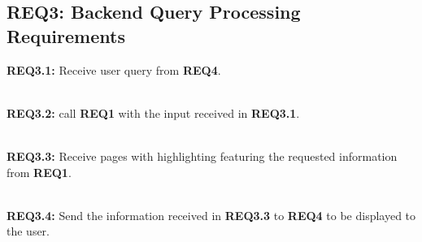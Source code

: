 \subsection{REQ3: Backend Query Processing Requirements}

\textbf{REQ3.1:} Receive user query from \textbf{REQ4}.\par

\textbf{\\REQ3.2:} call \textbf{REQ1} with the input received in \textbf{REQ3.1}.\par

\textbf{\\REQ3.3:} Receive pages with highlighting featuring the requested information from \textbf{REQ1}.\par

\textbf{\\REQ3.4:} Send the information received in \textbf{REQ3.3} to \textbf{REQ4} to be displayed to the user.\par

